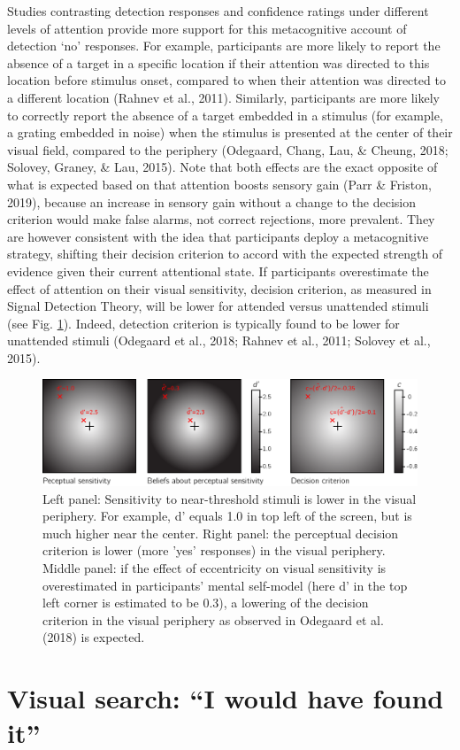 \documentclass[12pt,twoside]{reedthesis}
\begin{document}
Studies contrasting detection responses and confidence ratings under different levels of attention provide more support for this metacognitive account of detection `no' responses. For example, participants are more likely to report the absence of a target in a specific location if their attention was directed to this location before stimulus onset, compared to when their attention was directed to a different location (Rahnev et al., 2011). Similarly, participants are more likely to correctly report the absence of a target embedded in a stimulus (for example, a grating embedded in noise) when the stimulus is presented at the center of their visual field, compared to the periphery (Odegaard, Chang, Lau, \& Cheung, 2018; Solovey, Graney, \& Lau, 2015). Note that both effects are the exact opposite of what is expected based on that attention boosts sensory gain (Parr \& Friston, 2019), because an increase in sensory gain without a change to the decision criterion would make false alarms, not correct rejections, more prevalent. They are however consistent with the idea that participants deploy a metacognitive strategy, shifting their decision criterion to accord with the expected strength of evidence given their current attentional state. If participants overestimate the effect of attention on their visual sensitivity, decision criterion, as measured in Signal Detection Theory, will be lower for attended versus unattended stimuli (see Fig. \ref{fig:intro-detection}). Indeed, detection criterion is typically found to be lower for unattended stimuli (Odegaard et al., 2018; Rahnev et al., 2011; Solovey et al., 2015).
\begin{figure}
\includegraphics[width=1\linewidth]{figure/intro/detection} \caption{Left panel: Sensitivity to near-threshold stimuli is lower in the visual periphery. For example, d' equals 1.0 in top left of the screen, but is much higher near the center. Right panel: the perceptual decision criterion is lower (more 'yes' responses) in the visual periphery.  Middle panel: if the effect of eccentricity on visual sensitivity is overestimated in participants' mental self-model (here d' in the top left corner is estimated to be 0.3), a lowering of the decision criterion in the visual periphery as observed in Odegaard et al. (2018) is expected.}\label{fig:intro-detection}
\end{figure}
\hypertarget{intro:search}{%
\section{Visual search: ``I would have found it''}\label{intro:search}}
\end{document}
